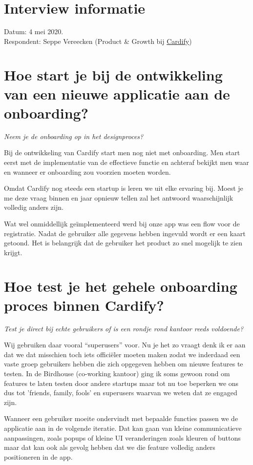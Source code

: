 \section{Interview informatie}

Datum: 4 mei 2020. \\
Respondent: Seppe Vereecken (Product \& Growth bij \href{https://getcardify.com/}{Cardify})

\section[Vraag 1]{Hoe start je bij de ontwikkeling van een nieuwe applicatie aan de onboarding?}

\textit{Neem je de onboarding op in het designproces?}

Bij de ontwikkeling van Cardify start men nog niet met onboarding. Men start eerst met de implementatie van de effectieve functie en  achteraf bekijkt men waar en wanneer er onboarding zou voorzien moeten worden.

Omdat Cardify nog steeds een startup is leren we uit elke ervaring bij. Moest je me deze vraag binnen en jaar opnieuw tellen zal het antwoord waarschijnlijk volledig anders zijn.

Wat wel onmiddellijk geïmplementeerd werd bij onze app was een flow voor de registratie. Nadat de gebruiker alle gegevens hebben ingevuld wordt er een kaart getoond. Het is belangrijk dat de gebruiker het product zo snel mogelijk te zien krijgt.

\section[Vraag 2]{Hoe test je het gehele onboarding proces binnen Cardify?}

\textit{Test je direct bij echte gebruikers of is een rondje rond kantoor reeds voldoende?}

Wij gebruiken daar vooral ``superusers'' voor. Nu je het zo vraagt denk ik er aan dat we dat misschien toch iets officiëler moeten maken zodat we inderdaad een vaste groep gebruikers hebben die zich opgegeven hebben om nieuwe features te testen. In de Birdhouse (co-working kantoor) ging ik soms gewoon rond om features te laten testen door andere startups maar tot nu toe beperken we ons dus tot 'friends, family, fools' en superusers waarvan we weten dat ze engaged zijn.

Wanneer een gebruiker moeite ondervindt met bepaalde functies passen we de applicatie aan in de volgende iteratie. Dat kan gaan van kleine communicatieve aanpassingen, zoals popups of kleine UI veranderingen zoals kleuren of buttons maar dat kan ook als gevolg hebben dat we die feature volledig anders positioneren in de app.

